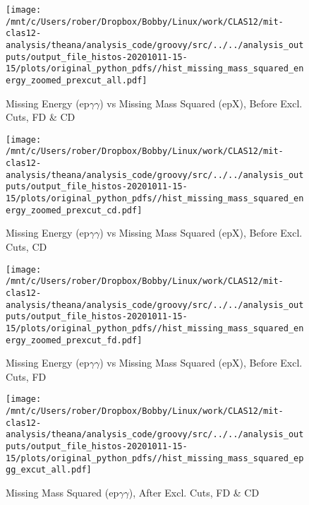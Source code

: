 \documentclass{article}
\begin{document}
\begin{landscape}
    \begin{figure}[h]
        \centering

        \texttt{[image: /mnt/c/Users/rober/Dropbox/Bobby/Linux/work/CLAS12/mit-clas12-analysis/theana/analysis\_code/groovy/src/../../analysis\_outputs/output\_file\_histos-20201011-15-15/plots/original\_python\_pdfs//hist\_missing\_mass\_squared\_energy\_zoomed\_prexcut\_all.pdf]}
        \captionsetup{textformat=empty,labelformat=blank}
        \caption{Missing Energy (ep$\gamma$$\gamma$) vs Missing Mass Squared (epX), Before Excl. Cuts, FD \& CD}
    \end{figure}
    \clearpage
    
    \begin{figure}[h]
        \centering

        \texttt{[image: /mnt/c/Users/rober/Dropbox/Bobby/Linux/work/CLAS12/mit-clas12-analysis/theana/analysis\_code/groovy/src/../../analysis\_outputs/output\_file\_histos-20201011-15-15/plots/original\_python\_pdfs//hist\_missing\_mass\_squared\_energy\_zoomed\_prexcut\_cd.pdf]}
        \captionsetup{textformat=empty,labelformat=blank}
        \caption{Missing Energy (ep$\gamma$$\gamma$) vs Missing Mass Squared (epX), Before Excl. Cuts, CD}
    \end{figure}
    \clearpage
    
    \begin{figure}[h]
        \centering

        \texttt{[image: /mnt/c/Users/rober/Dropbox/Bobby/Linux/work/CLAS12/mit-clas12-analysis/theana/analysis\_code/groovy/src/../../analysis\_outputs/output\_file\_histos-20201011-15-15/plots/original\_python\_pdfs//hist\_missing\_mass\_squared\_energy\_zoomed\_prexcut\_fd.pdf]}
        \captionsetup{textformat=empty,labelformat=blank}
        \caption{Missing Energy (ep$\gamma$$\gamma$) vs Missing Mass Squared (epX), Before Excl. Cuts, FD}
    \end{figure}
    \clearpage
    
    \begin{figure}[h]
        \centering

        \texttt{[image: /mnt/c/Users/rober/Dropbox/Bobby/Linux/work/CLAS12/mit-clas12-analysis/theana/analysis\_code/groovy/src/../../analysis\_outputs/output\_file\_histos-20201011-15-15/plots/original\_python\_pdfs//hist\_missing\_mass\_squared\_epgg\_excut\_all.pdf]}
        \captionsetup{textformat=empty,labelformat=blank}
        \caption{Missing Mass Squared (ep$\gamma$$\gamma$), After Excl. Cuts, FD \& CD}
    \end{figure}
    \clearpage
    

\end{landscape}
\end{document}
